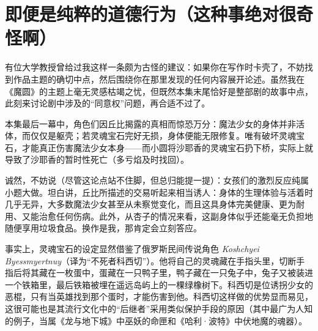 \chapter[即便是纯粹的道德行为（这种事绝对很奇怪啊）]{即便是纯粹的道德行为\protect\footnotemark（这种事绝对很奇怪啊）}

有位大学教授曾给过我这样一条颇为古怪的建议：如果你在写作时卡壳了，不妨找到作品主题的确切中点，然后围绕你在那里发现的任何内容展开论述。虽然我在《魔圆》的主题上毫无灵感枯竭之忧，但既然本集末尾恰好是整部剧的故事中点，此刻来讨论剧中涉及的“同意权”问题，再合适不过了。
  
本集最后一幕中，角色们因丘比揭露的真相而惊恐万分：魔法少女的身体并非活体，而仅仅是躯壳；若灵魂宝石完好无损，身体便能无限修复。唯有破坏灵魂宝石，才能真正伤害魔法少女本身——而小圆将沙耶香的灵魂宝石扔下桥，实际上就导致了沙耶香的暂时性死亡（多亏焰及时找回）。  

诚然，不妨说（尽管这论点站不住脚，但总归能提一提）：女孩们的激烈反应纯属小题大做。坦白讲，丘比所描述的交易听起来相当诱人：身体的生理体验与活着时几乎无异，大多数魔法少女甚至从未察觉变化，而且这具身体完美健康、更为耐用、又能治愈任何伤病。此外，从杏子的情况来看，这副身体似乎还能毫无负担地随便享用垃圾食品。换作是我，那肯定会立刻答应。

事实上，灵魂宝石的设定显然借鉴了俄罗斯民间传说角色 \emph{Koshchyei Byessmyertnuy}（译为“不死者科西切”）。他将自己的灵魂藏在手指头里，切断手指后将其藏在一枚蛋中，蛋藏在一只鸭子里，鸭子藏在一只兔子中，兔子又被装进一个铁箱里，最后铁箱被埋在遥远岛屿上的一棵绿橡树下。科西切是位诱拐少女的恶棍，只有当英雄找到那个蛋时，才能伤害到他\cite{ref34}。科西切这样做的优势显而易见，这很可能也是其流行文化中的“后继者”采用类似保护手段的原因（其中最广为人知的例子，当属《龙与地下城》\cite{ref35}中巫妖的命匣和《哈利·波特》\cite{ref36}中伏地魔的魂器）。 


